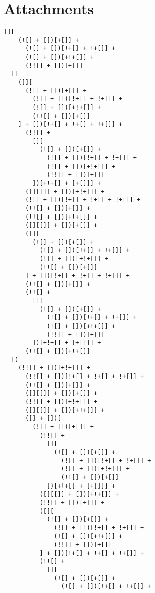 \section{Attachments}

%

\begin{lstlisting}[style=basicStyle, caption=alert('XSS') in JSFuck, label={lst:alertxssjsfuck}]
  [][
    (![] + [])[+[]] +
      (![] + [])[!+[] + !+[]] +
      (![] + [])[+!+[]] +
      (!![] + [])[+[]]
  ][
    ([][
      (![] + [])[+[]] +
        (![] + [])[!+[] + !+[]] +
        (![] + [])[+!+[]] +
        (!![] + [])[+[]]
    ] + [])[!+[] + !+[] + !+[]] +
      (!![] +
        [][
          (![] + [])[+[]] +
            (![] + [])[!+[] + !+[]] +
            (![] + [])[+!+[]] +
            (!![] + [])[+[]]
        ])[+!+[] + [+[]]] +
      ([][[]] + [])[+!+[]] +
      (![] + [])[!+[] + !+[] + !+[]] +
      (!![] + [])[+[]] +
      (!![] + [])[+!+[]] +
      ([][[]] + [])[+[]] +
      ([][
        (![] + [])[+[]] +
          (![] + [])[!+[] + !+[]] +
          (![] + [])[+!+[]] +
          (!![] + [])[+[]]
      ] + [])[!+[] + !+[] + !+[]] +
      (!![] + [])[+[]] +
      (!![] +
        [][
          (![] + [])[+[]] +
            (![] + [])[!+[] + !+[]] +
            (![] + [])[+!+[]] +
            (!![] + [])[+[]]
        ])[+!+[] + [+[]]] +
      (!![] + [])[+!+[]]
  ](
    (!![] + [])[+!+[]] +
      (!![] + [])[!+[] + !+[] + !+[]] +
      (!![] + [])[+[]] +
      ([][[]] + [])[+[]] +
      (!![] + [])[+!+[]] +
      ([][[]] + [])[+!+[]] +
      ([] + [])[
        (![] + [])[+[]] +
          (!![] +
            [][
              (![] + [])[+[]] +
                (![] + [])[!+[] + !+[]] +
                (![] + [])[+!+[]] +
                (!![] + [])[+[]]
            ])[+!+[] + [+[]]] +
          ([][[]] + [])[+!+[]] +
          (!![] + [])[+[]] +
          ([][
            (![] + [])[+[]] +
              (![] + [])[!+[] + !+[]] +
              (![] + [])[+!+[]] +
              (!![] + [])[+[]]
          ] + [])[!+[] + !+[] + !+[]] +
          (!![] +
            [][
              (![] + [])[+[]] +
                (![] + [])[!+[] + !+[]] +

\end{lstlisting}
